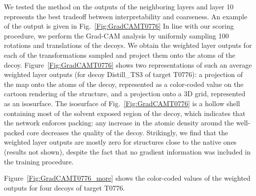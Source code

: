 We tested the method on the outputs of the neighboring layers and
layer 10 represents the best tradeoff between interpretability and
coarseness.
An example of the output is given in Fig.~\ref{Fig:GradCAMT0776}
In line with our scoring procedure, we perform the Grad-CAM analysis
by uniformly sampling 100 rotations and translations of the decoys. We
obtain the weighted layer outputs for each of the transformations sampled and
project them onto the atoms of the
decoy. Figure~\ref{Fig:GradCAMT0776} shows two representations of such
an average weighted layer outputs (for decoy Distill\_TS3 of target T0776): a
projection of the map onto the atoms of the decoy, represented as a
color-coded value on the cartoon rendering of the structure, and a
projection onto a 3D grid, represented as an isosurface. The
isosurface of Fig.~\ref{Fig:GradCAMT0776} is a hollow shell containing
most of the solvent exposed region of the decoy, which indicates that
the network enforces packing: any increase in the atomic density
around the well-packed core decreases the quality of the decoy.
%
Strikingly, we find that the weighted layer outputs are mostly zero for
structures close to the native ones (results not shown), despite the
fact that no gradient information was included in the training
procedure. 

Figure~\ref{Fig:GradCAMT0776_more} shows the color-coded
values of the weighted outputs for four decoys of target T0776.


